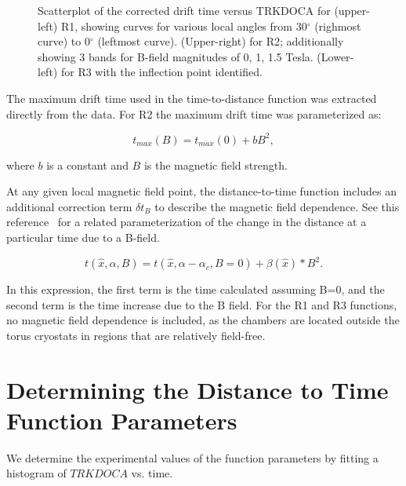 \documentclass{article}
\begin{document}
\begin{figure}[htb]
\vspace{15.cm} 
\caption{\small{Scatterplot of the corrected drift time versus TRKDOCA for 
(upper-left) R1, showing curves for various local angles from 30$^{\circ}$
(righmost curve) to 0$^{\circ}$ (leftmost curve).  (Upper-right) for R2; 
additionally showing 3 bands for B-field magnitudes of 0, 1, 1.5 Tesla.
(Lower-left) for R3 with the inflection point identified.}}
\label{xvst}
\end{figure}


The maximum drift time used in the time-to-distance function was extracted 
directly from the data.  For R2 the maximum drift time was parameterized as:

\begin{equation} 
\label{eq-bmax}
t_{max}(B) = t_{max}(0) + b B^2,
\end{equation}

\noindent
where $b$ is a constant and $B$ is the magnetic field strength.

At any given local magnetic field point, the distance-to-time function 
includes an additional correction term $\delta t_B$ to describe 
the magnetic field dependence.  See this reference~\cite{qin96} for a related
parameterization of the change in the distance at a particular time due to a
B-field. 

\begin{equation}
\label{XTB}
t(\hat{x},\alpha,B) = t(\hat{x},\alpha-\alpha_c, B=0) +  \beta(\hat{x})*B^2.
\end{equation}

\noindent
In this expression, the first term is the time calculated assuming B=0, and the
second term is the time increase due to the B field.  For the R1 and R3 functions, no magnetic field 
dependence is included, as the chambers are located outside the torus 
cryostats in regions that are relatively field-free.


\section{Determining the Distance to Time Function Parameters}
We determine the experimental values of the function parameters by fitting
a histogram of $TRKDOCA$ vs. time.
\end{document}
